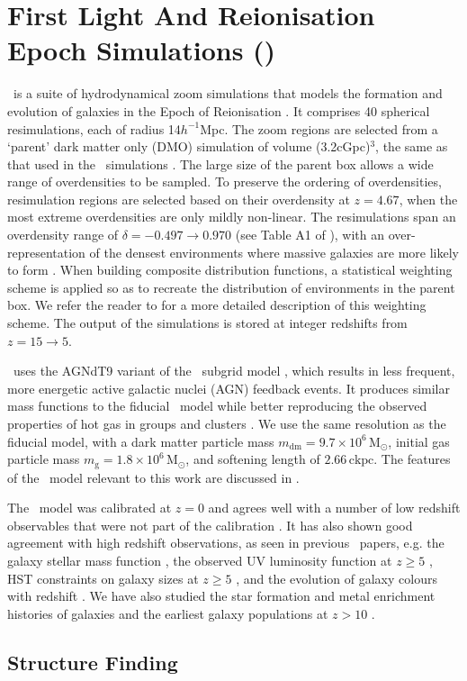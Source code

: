 \section{First Light And Reionisation Epoch Simulations (\flares)}
\label{sec:flares}

\flares\ is a suite of hydrodynamical zoom simulations that models the formation and evolution of galaxies in the Epoch of Reionisation \citep{Lovell2021, Vijayan2020}. It comprises 40 spherical resimulations, each of radius 14$h^{-1}$Mpc. The zoom regions are selected from a `parent' dark matter only (DMO) simulation of volume (3.2cGpc)$^{3}$, the same as that used in the \ceagle\ simulations \citep{barnes_cluster-eagle_2017}. The large size of the parent box allows a wide range of overdensities to be sampled. To preserve the ordering of overdensities, resimulation regions are selected based on their overdensity at $z=4.67$, when the most extreme overdensities are only mildly non-linear. The resimulations span an overdensity range of $\delta=-0.497\rightarrow0.970$ (see Table A1 of \cite{Lovell2021}), with an over-representation of the densest environments where massive galaxies are more likely to form \citep{chiang_ancient_2013, lovell_characterising_2018}. When building composite distribution functions, a statistical weighting scheme is applied so as to recreate the distribution of environments in the parent box. We refer the reader to \cite{Lovell2021} for a more detailed description of this weighting scheme. The output of the simulations is stored at integer redshifts from $z=15\rightarrow5$.

\flares\ uses the AGNdT9 variant of the \eagle\ subgrid model \citep{schaye_eagle_2015, crain_eagle_2015}, which results in less frequent, more energetic active galactic nuclei (AGN) feedback events. It produces similar mass functions to the fiducial \eagle\ model while better reproducing the observed properties of hot gas in groups and clusters \citep{barnes_cluster-eagle_2017}. We use the same resolution as the fiducial model, with a dark matter particle mass $m_{\mathrm{dm}} = 9.7 \times 10^6\, \mathrm{M}_{\odot}$, initial gas particle mass $m_{\mathrm{g}} = 1.8 \times 10^6\, \mathrm{M}_{\odot}$, and softening length of $2.66\, \mathrm{ckpc}$. The features of the \eagle\ model relevant to this work are discussed in . 

The \eagle\ model was calibrated at $z=0$ and agrees well with a number of low redshift observables that were not part of the calibration \citep[e.g.][]{furlong_evolution_2015, Trayford2015, Lagos2015}. It has also shown good agreement with high redshift observations, as seen in previous \flares\ papers, e.g. the galaxy stellar mass function \citep{Lovell2021}, the observed UV luminosity function at $z \geq 5$ \citep{Vijayan2020, Vijayan2022}, HST constraints on galaxy sizes at $z\geq5$ \citep{Roper22}, and the evolution of galaxy colours with redshift \citep{Wilkins22_color}. We have also studied the star formation and metal enrichment histories of galaxies \citep{Wilkins22_metal} and the earliest galaxy populations at $z > 10$ \citep{Wilkins22_frontier}.

\subsection{Structure Finding}
\label{sec:struct_find}